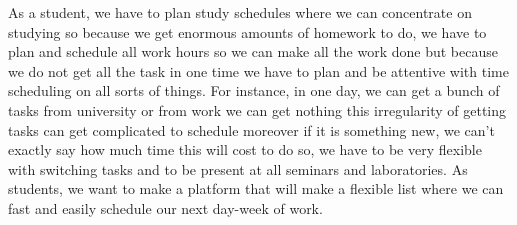 As a student, we have to plan study schedules where we can concentrate on studying so because we get enormous amounts of homework to do, we have to plan and schedule all work hours so we can make all the work done but because we do not get all the task in one time we have to plan and be attentive with time scheduling on all sorts of things. For instance, in one day, we can get a bunch of tasks from university or from work we can get nothing this irregularity of getting tasks can get complicated to schedule moreover if it is something new, we can't exactly say how much time this will cost to do so, we have to be very flexible with switching tasks and to be present at all seminars and laboratories. As students, we want to make a platform that will make a flexible list where we can fast and easily schedule our next day-week of work. 

\clearpage